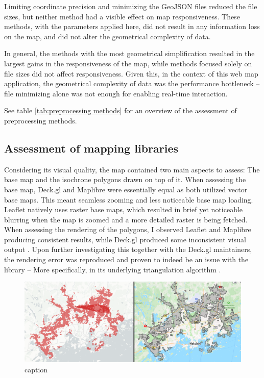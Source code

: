 Limiting coordinate precision and minimizing the GeoJSON files
reduced the file sizes,
but neither method had a visible effect on map responsiveness.
These methods, with the parameters applied here,
did not result in any information loss on the map,
and did not alter the geometrical complexity of data.

In general, the methods with the most geometrical simplification
resulted in the largest gains in the responsiveness of the map,
while methods focused solely on file sizes did not affect responsiveness.
Given this, in the context of this web map application,
the geometrical complexity of data was the performance bottleneck --
file minimizing alone was not enough for enabling real-time interaction.

See table \ref{tab:preprocessing methods} for
an overview of the assessment of preprocessing methods.




\subsection{Assessment of mapping libraries}


Considering its visual quality,
the map contained two main aspects to assess:
The base map and the isochrone polygons drawn on top of it.
When assessing the base map,
Deck.gl and Maplibre were essentially equal as both utilized vector base maps.
This meant seamless zooming and less noticeable base map loading.
Leaflet natively uses raster base maps, which resulted in brief yet noticeable
blurring when the map is zoomed and a more detailed raster is being fetched.
When assessing the rendering of the polygons,
I observed Leaflet and Maplibre producing consistent results,
while Deck.gl produced some inconsistent visual output .
Upon further investigating this together with the Deck.gl maintainers,
the rendering error was reproduced and proven to indeed be an issue with the library \parencite{deckbug} --
More specifically, in its underlying triangulation algorithm \parencite{earcutbug}.

\begin{figure}[H]
	\centering
	\includegraphics[width=\textwidth]{visual/figures/screenshots/bug.png}
	\caption{caption \parencite{deckbug}}
	\label{fig:bug}
\end{figure}


